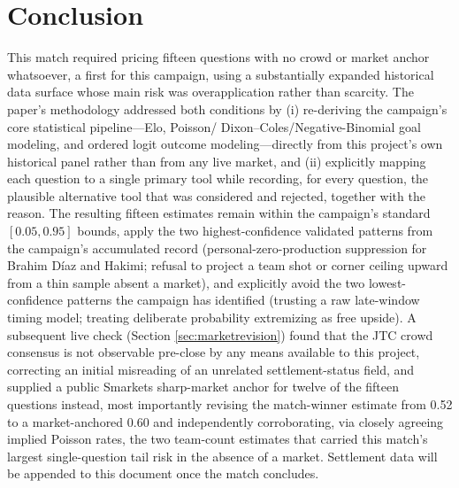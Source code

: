 \documentclass[11pt]{article}
\begin{document}
\section{Conclusion}

This match required pricing fifteen questions with no crowd or market anchor whatsoever,
a first for this campaign, using a substantially expanded historical data surface whose
main risk was overapplication rather than scarcity. The paper's methodology addressed both
conditions by (i) re-deriving the campaign's core statistical pipeline---Elo, Poisson/
Dixon--Coles/Negative-Binomial goal modeling, and ordered logit outcome modeling---directly
from this project's own historical panel rather than from any live market, and (ii)
explicitly mapping each question to a single primary tool while recording, for every
question, the plausible alternative tool that was considered and rejected, together with
the reason. The resulting fifteen estimates remain within the campaign's standard
$[0.05, 0.95]$ bounds, apply the two highest-confidence validated patterns from the
campaign's accumulated record (personal-zero-production suppression for Brahim D\'iaz and
Hakimi; refusal to project a team shot or corner ceiling upward from a thin sample absent
a market), and explicitly avoid the two lowest-confidence patterns the campaign has
identified (trusting a raw late-window timing model; treating deliberate probability
extremizing as free upside). A subsequent live check (Section \ref{sec:marketrevision})
found that the JTC crowd consensus is not observable pre-close by any means available to
this project, correcting an initial misreading of an unrelated settlement-status field,
and supplied a public Smarkets sharp-market anchor for twelve of the fifteen questions
instead, most importantly revising the match-winner estimate from 0.52 to a
market-anchored 0.60 and independently corroborating, via closely agreeing implied
Poisson rates, the two team-count estimates
that carried this match's largest single-question tail risk in the absence of a market.
Settlement data will be appended to this document once the match concludes.



\end{document}
